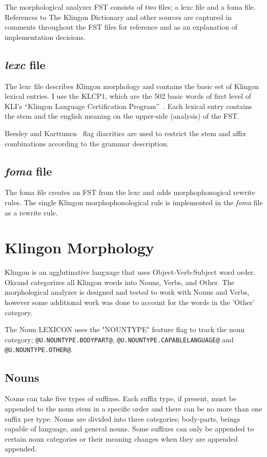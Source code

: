 \documentclass[11pt]{article}
\begin{document}
The morphological analyzer FST consists of two files; a lexc file and a foma file. References to The Klingon Dictionary and other sources are captured in comments throughout the FST files for reference and as an explanation of implementation decisions.

\subsection{\textit{lexc} file}

The lexc file describes Klingon morphology and contains the basic set of Klingon lexical entries. I use the KLCP1, which are the 502 basic words of first level of KLI's ``Klingon Language Certification Program''~\cite{Zrajm:12}. Each lexical entry contains the stem and the english meaning on the upper-side (analysis) of the FST.

Beesley and Karttunen~ flag diacritics are used to restrict the stem and affix combinations according to the grammar description.

\subsection{\textit{foma} file}

The foma file creates an FST from the lexc and adds morphophonogical rewrite rules. The single Klingon morphophonological rule is implemented in the \textit{foma} file as a rewrite rule.

\section{Klingon Morphology}

Klingon is an agglutinative language that uses Object-Verb-Subject word order. Okrand categorizes all Klingon words into Nouns, Verbs, and Other. The morphological analyzer is designed and tested to work with Nouns and Verbs, however some additional work was done to account for the words in the 'Other' category.

The Noun LEXICON uses the "NOUNTYPE" feature flag to track the noun category; \texttt{@U.NOUNTYPE.BODYPART@}, \texttt{@U.NOUNTYPE.CAPABLELANGUAGE@} and \texttt{@U.NOUNTYPE.OTHER@}.

\subsection {Nouns}

Nouns can take five types of suffixes. Each suffix type, if present, must be appended to the noun stem in a specific order and there can be no more than one suffix per type. Nouns are divided into three categories; body-parts, beings capable of language, and general nouns. Some suffixes can only be appended to certain noun categories or their meaning changes when they are appended appended.
\end{document}
